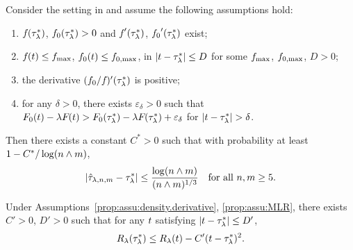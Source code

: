 \begin{proposition}\label{prop:convergence.rate}
   Consider the setting in  and assume the following assumptions hold:
    \begin{enumerate}
        \item \label{prop:assu:density.derivative} ${f_{}}({\tau^*_\lambda})$, ${f_{0}}({\tau^*_\lambda}) > 0$ and ${f_{}}'({\tau^*_\lambda})$, ${f_{0}}'({\tau^*_\lambda})$ exist;
        \item \label{prop:assu:density.upper.bound}
         ${f_{}}({t}) \le {f_{\max}}$, ${f_{0}}({t}) \le {f_{0,\max}}$, in $|{t} - {\tau^*_\lambda}| \le D$ for some ${f_{\max}}$, ${f_{0,\max}}$, $D > 0$;
        \item \label{prop:assu:MLR} the derivative $({f_{0}}/{f_{}})'({\tau^*_\lambda})$ is positive;
        \item \label{prop:assu:Bayes.risk} for any $\delta > 0$, there exists $\varepsilon_\delta > 0$ such that ${F_{0}}({t}) - \lambda {F_{}}({t}) > {F_{0}}({\tau^*_\lambda}) - \lambda {F_{}}({\tau^*_\lambda}) + \varepsilon_\delta$ for $|{t} - {\tau^*_\lambda}| > \delta$.
    \end{enumerate}
    Then there exists a constant $C^*>0$ such that with
    probability at least $1 - C^*/\log({n} \wedge m)$,
    \begin{align}\label{eq:prop:convergence.rate}
        \left|{\hat{\tau}_{\lambda, {n}, m}} - {\tau^*_\lambda}\right|
        \le \frac{\log({n} \wedge m)}{({n} \wedge
      m)^{1/3}}\quad \text{for all}~{n}, m \ge 5.
    \end{align}
\end{proposition}


\begin{lemma}\label{lemm:risk.valley}
Under Assumptions~\ref{prop:assu:density.derivative}, \ref{prop:assu:MLR}, there exists $C' > 0$, $D' > 0$ such that for any ${t}$ satisfying $\left|{t} - {\tau^*_\lambda} \right| \le D'$,
\begin{align}\label{eq:lemm:risk.valley}
    {R_{\lambda}}({\tau^*_\lambda}) \le {R_{\lambda}}({t}) - C' ({t} - {\tau^*_\lambda})^2.
\end{align}
\end{lemma}


